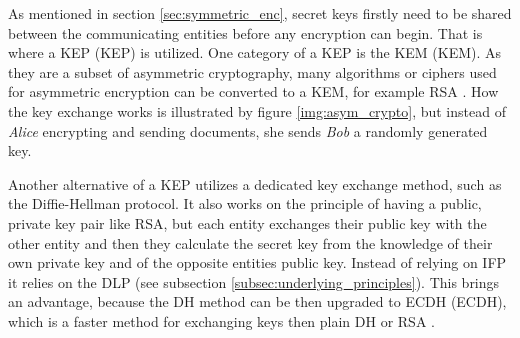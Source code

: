 As mentioned in section \ref{sec:symmetric_enc}, secret keys firstly need to be shared between the communicating entities before any encryption can begin. That is where a KEP (\acl{KEP}) is utilized. One category of a KEP is the KEM (\acl{KEM}). As they are a subset of asymmetric cryptography, many algorithms or ciphers used for asymmetric encryption can be converted to a KEM, for example RSA \cite{Ristic2014}. How the key exchange works is illustrated by figure \ref{img:asym_crypto}, but instead of \textit{Alice} encrypting and sending documents, she sends \textit{Bob} a randomly generated key.

Another alternative of a KEP utilizes a dedicated key exchange method, such as the Diffie-Hellman protocol. It also works on the principle of having a public, private key pair like RSA, but each entity exchanges their public key with the other entity and then they calculate the secret key from the knowledge of their own private key and of the opposite entities public key. Instead of relying on IFP it relies on the DLP (see subsection \ref{subsec:underlying_principles}). This brings an advantage, because the DH method can be then upgraded to \acl{ECDH} (ECDH), which is a faster method for exchanging keys then plain DH or RSA \cite{Ristic2014}.
